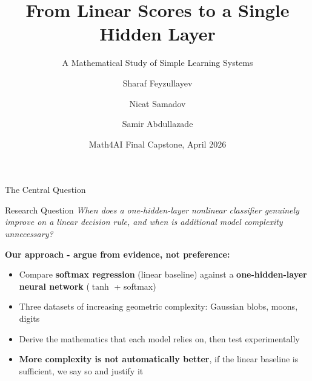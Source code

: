 \documentclass[11pt,aspectratio=169]{beamer}
\title[Math4AI Capstone]{From Linear Scores to a Single Hidden Layer}
\subtitle{A Mathematical Study of Simple Learning Systems}
\author[Feyzullayev, Samadov, Abdullazade]{Sharaf Feyzullayev \and Nicat Samadov \and Samir Abdullazade}
\institute{National AI Center --- AI Academy}
\date{Math4AI Final Capstone, April 2026}
\begin{document}
\begin{frame}
\titlepage
\end{frame}

\begin{frame}{The Central Question}

\begin{block}{Research Question}
\textit{When does a one-hidden-layer nonlinear classifier genuinely improve on a linear decision rule, and when is additional model complexity unnecessary?}
\end{block}

\vspace{0.6em}

\textbf{Our approach - argue from evidence, not preference:}
\begin{itemize}
    \item Compare \textbf{softmax regression} (linear baseline) against a \textbf{one-hidden-layer neural network} ($\tanh$ + softmax)
    \item Three datasets of increasing geometric complexity: Gaussian blobs, moons, digits
    \item Derive the mathematics that each model relies on, then test experimentally
    \item \textbf{More complexity is not automatically better}, if the linear baseline is sufficient, we say so and justify it
\end{itemize}
\end{frame}
\end{document}
